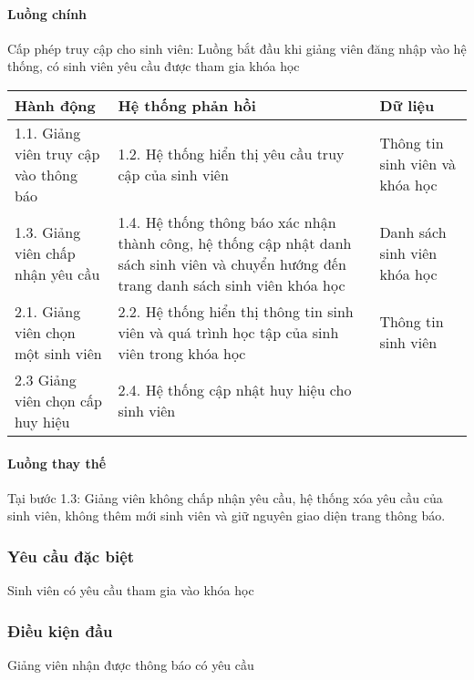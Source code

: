 \documentclass[./../main_file.tex]{subfiles}
\begin{document}
\paragraph{Luồng chính}
Cấp phép truy cập cho sinh viên: Luồng bắt đầu khi giảng viên đăng nhập vào hệ thống, có sinh viên yêu cầu được tham gia khóa học
\begin{table}[H]
				\begin{tabular}{|p{.33\textwidth}|p{}|p{}|}
		\hline
		\textbf{Hành động}                     & \textbf{Hệ thống phản hồi}                                                                  & \textbf{Dữ liệu}                \\ \hline
		1.1. Giảng viên truy cập vào thông báo & 1.2. Hệ thống hiển thị yêu cầu truy cập của sinh viên                                       & Thông tin sinh viên và khóa học \\ \hline
		1.3. Giảng viên chấp nhận yêu cầu &
		1.4. Hệ thống thông báo xác nhận thành công, hệ thống cập nhật danh sách sinh viên và chuyển hướng đến trang danh sách sinh viên khóa học &
		Danh sách sinh viên khóa học \\ \hline
		2.1. Giảng viên chọn một sinh viên     & 2.2. Hệ thống hiển thị thông tin sinh viên và quá trình học tập của sinh viên trong khóa học & Thông tin sinh viên             \\ \hline
		2.3 Giảng viên chọn cấp huy hiệu       & 2.4. Hệ thống cập nhật huy hiệu cho sinh viên                                               &                                 \\ \hline
	\end{tabular}
\end{table}
\paragraph{Luồng thay thế}
Tại bước 1.3: Giảng viên không chấp nhận yêu cầu, hệ thống xóa yêu cầu của sinh viên, không thêm mới sinh viên và giữ nguyên giao diện trang thông báo.
\subsubsection{Yêu cầu đặc biệt}
Sinh viên có yêu cầu tham gia vào khóa học

\subsubsection{Điều kiện đầu}
Giảng viên nhận được thông báo có yêu cầu 
\end{document}
